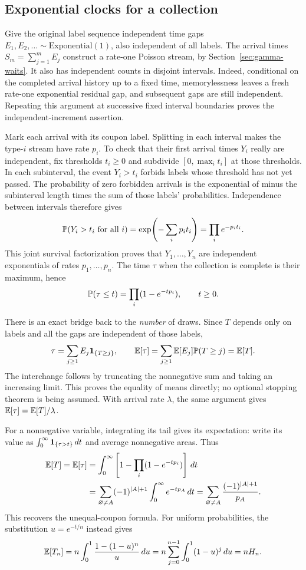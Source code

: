\subsection{Exponential clocks for a collection}

Give the original label sequence independent time gaps
$E_1,E_2,\ldots\sim\text{Exponential}(1)$, also independent of all labels.
The arrival times $S_m=\sum_{j=1}^mE_j$ construct a rate-one Poisson
stream, by Section~\ref{sec:gamma-waits}. It also has independent counts
in disjoint intervals. Indeed, conditional on the completed arrival
history up to a fixed time, memorylessness leaves a fresh rate-one
exponential residual gap, and subsequent gaps are still independent.
Repeating this argument at successive fixed interval boundaries proves
the independent-increment assertion.

Mark each arrival with its coupon label. Splitting in each interval
makes the type-$i$ stream have rate $p_i$. To check that their first
arrival times $Y_i$ really are independent, fix thresholds $t_i\ge0$
and subdivide $[0,\max_i t_i]$ at those thresholds. In each subinterval,
the event $Y_i>t_i$ forbids labels whose threshold has not yet passed.
The probability of zero forbidden arrivals is the exponential of minus
the subinterval length times the sum of those labels' probabilities.
Independence between intervals therefore gives
\[
\P(Y_i>t_i\text{ for all }i)=\exp\!\left(-\sum_i p_i t_i\right)
=\prod_i e^{-p_it_i}.
\]
This joint survival factorization proves that
$Y_1,\ldots,Y_n$ are independent exponentials of rates $p_1,\ldots,p_n$.
The time $\tau$ when the collection is complete is their maximum, hence
\[
\P(\tau\le t)=\prod_i(1-e^{-tp_i}),\qquad t\ge0.
\]

There is an exact bridge back to the \emph{number} of draws. Since
$T$ depends only on labels and all the gaps are independent of those labels,
\[
\tau=\sum_{j\ge1}E_j\ind_{\{T\ge j\}},\qquad
\E[\tau]=\sum_{j\ge1}\E[E_j]\P(T\ge j)=\E[T].
\]
The interchange follows by truncating the nonnegative sum and taking an
increasing limit. This proves the equality of means directly; no optional
stopping theorem is being assumed. With arrival rate $\lambda$, the
same argument gives $\E[\tau]=\E[T]/\lambda$.

For a nonnegative variable, integrating its tail gives its expectation:
write its value as $\int_0^\infty\ind_{\{\tau>t\}}\,dt$ and average
nonnegative areas. Thus
\begin{align*}
\E[T]=\E[\tau]
&=\int_0^\infty\left[1-\prod_i(1-e^{-tp_i})\right]\,dt\\
&=\sum_{\varnothing\ne A}(-1)^{|A|+1}\int_0^\infty e^{-tp_A}\,dt
=\sum_{\varnothing\ne A}\frac{(-1)^{|A|+1}}{p_A}.
\end{align*}
This recovers the unequal-coupon formula. For uniform probabilities,
the substitution $u=e^{-t/n}$ instead gives
\[
\E[T_n]=n\int_0^1\frac{1-(1-u)^n}{u}\,du
=n\sum_{j=0}^{n-1}\int_0^1(1-u)^j\,du=nH_n.
\]

